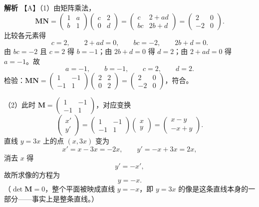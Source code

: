 \begin{answer}
\textbf{解析}
【A】（1）由矩阵乘法，
\nopagebreak[4]
\[\boldsymbol M\boldsymbol N=\begin{pmatrix}1&a\\b&1\end{pmatrix}\begin{pmatrix}c&2\\0&d\end{pmatrix}
=\begin{pmatrix}c&2+ad\\bc&2b+d\end{pmatrix}
=\begin{pmatrix}2&0\\-2&0\end{pmatrix}.\]
比较各元素得
\nopagebreak[4]
\[c=2,\qquad 2+ad=0,\qquad bc=-2,\qquad 2b+d=0.\]
由 $bc=-2$ 且 $c=2$ 得 $b=-1$；由 $2b+d=0$ 得 $d=2$；由 $2+ad=0$ 得 $a=-1$。故
\nopagebreak[4]
\[a=-1,\qquad b=-1,\qquad c=2,\qquad d=2.\]
检验：$\boldsymbol M\boldsymbol N=\begin{pmatrix}1&-1\\-1&1\end{pmatrix}\begin{pmatrix}2&2\\0&2\end{pmatrix}=\begin{pmatrix}2&0\\-2&0\end{pmatrix}$，符合。

（2）此时 $\boldsymbol M=\begin{pmatrix}1&-1\\-1&1\end{pmatrix}$，对应变换
\nopagebreak[4]
\[\begin{pmatrix}x'\\y'\end{pmatrix}=\begin{pmatrix}1&-1\\-1&1\end{pmatrix}\begin{pmatrix}x\\y\end{pmatrix}
=\begin{pmatrix}x-y\\-x+y\end{pmatrix}.\]
直线 $y=3x$ 上的点 $(x,3x)$ 变为
\nopagebreak[4]
\[x'=x-3x=-2x,\qquad y'=-x+3x=2x,\]
消去 $x$ 得
\nopagebreak[4]
\[y'=-x',\]
故所求像的方程为
\nopagebreak[4]
\[y=-x.\]
（$\det\boldsymbol M=0$，整个平面被映成直线 $y=-x$，即 $y=3x$ 的像是这条直线本身的一部分——事实上是整条直线。）


\end{answer}
